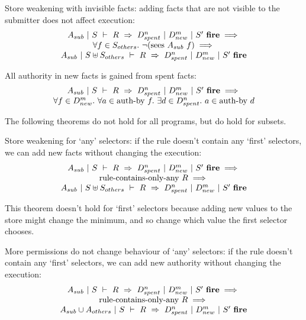 \begin{theorem}
Store weakening with invisible facts: adding facts that are not visible to the submitter does not affect execution:
$$
\begin{array}{c}
A_{sub}~|~S~\vdash~R~\Rightarrow~D_{spent}^n~|~D_{new}^m~|~S'~\textbf{fire}
\implies \\
\forall f \in S_{others}.\ \neg (\textrm{sees}~ A_{sub}~ f)
\implies \\
A_{sub}~|~S \uplus S_{others}~\vdash~R~\Rightarrow~D_{spent}^n~|~D_{new}^m~|~S'~\textbf{fire}
\end{array}
$$
\end{theorem}

\begin{theorem}
All authority in new facts is gained from spent facts:
$$
\begin{array}{c}
A_{sub}~|~S~\vdash~R~\Rightarrow~D_{spent}^n~|~D_{new}^m~|~S'~\textbf{fire}
\implies \\
\forall f \in D_{new}^m.\ \forall a \in \textrm{auth-by}~f.\ \exists d \in D_{spent}^n.\ a \in \textrm{auth-by}~d
\end{array}
$$
\end{theorem}

The following theorems do not hold for all programs, but do hold for subsets.

\begin{theorem}
Store weakening for `any' selectors: if the rule doesn't contain any `first' selectors, we can add new facts without changing the execution:
$$
\begin{array}{c}
A_{sub}~|~S~\vdash~R~\Rightarrow~D_{spent}^n~|~D_{new}^m~|~S'~\textbf{fire}
\implies \\
\textrm{rule-contains-only-any}~R \implies \\
A_{sub}~|~S \uplus S_{others}~\vdash~R~\Rightarrow~D_{spent}^n~|~D_{new}^m~|~S'~\textbf{fire}
\end{array}
$$
\end{theorem}

This theorem doesn't hold for `first' selectors because adding new values to the store might change the minimum, and so change which value the first selector chooses.

\begin{theorem}
More permissions do not change behaviour of `any' selectors: if the rule doesn't contain any `first' selectors, we can add new authority without changing the execution:
$$
\begin{array}{c}
A_{sub}~|~S~\vdash~R~\Rightarrow~D_{spent}^n~|~D_{new}^m~|~S'~\textbf{fire}
\implies \\
\textrm{rule-contains-only-any}~R \implies \\
A_{sub} \cup A_{others}~|~S~\vdash~R~\Rightarrow~D_{spent}^n~|~D_{new}^m~|~S'~\textbf{fire}
\end{array}
$$
\end{theorem}

